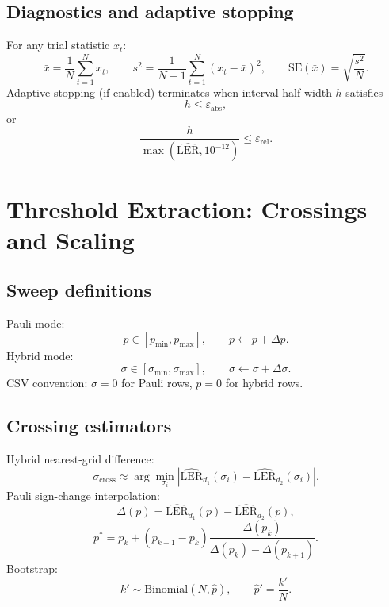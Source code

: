 \documentclass[11pt]{article}
\begin{document}
\subsection{Diagnostics and adaptive stopping}
For any trial statistic $x_t$:
\begin{equation}
\bar x=\frac{1}{N}\sum_{t=1}^N x_t,\qquad
s^2=\frac{1}{N-1}\sum_{t=1}^N(x_t-\bar x)^2,\qquad
\mathrm{SE}(\bar x)=\sqrt{\frac{s^2}{N}}.
\end{equation}
Adaptive stopping (if enabled) terminates when interval half-width $h$ satisfies
\begin{equation}
h\le\varepsilon_{\mathrm{abs}},
\end{equation}
or
\begin{equation}
\frac{h}{\max(\widehat{\mathrm{LER}},10^{-12})}\le\varepsilon_{\mathrm{rel}}.
\end{equation}

\section{Threshold Extraction: Crossings and Scaling}
\subsection{Sweep definitions}
Pauli mode:
\begin{equation}
p\in[p_{\min},p_{\max}],\qquad p\leftarrow p+\Delta p.
\end{equation}
Hybrid mode:
\begin{equation}
\sigma\in[\sigma_{\min},\sigma_{\max}],\qquad \sigma\leftarrow \sigma+\Delta \sigma.
\end{equation}
CSV convention: $\sigma=0$ for Pauli rows, $p=0$ for hybrid rows.

\subsection{Crossing estimators}
Hybrid nearest-grid difference:
\begin{equation}
\sigma_{\mathrm{cross}}\approx\arg\min_{\sigma_i}
\left|
\widehat{\mathrm{LER}}_{d_1}(\sigma_i)-\widehat{\mathrm{LER}}_{d_2}(\sigma_i)
\right|.
\end{equation}
Pauli sign-change interpolation:
\begin{equation}
\Delta(p)=\widehat{\mathrm{LER}}_{d_1}(p)-\widehat{\mathrm{LER}}_{d_2}(p),
\end{equation}
\begin{equation}
p^*=p_k+(p_{k+1}-p_k)\frac{\Delta(p_k)}{\Delta(p_k)-\Delta(p_{k+1})}.
\end{equation}
Bootstrap:
\begin{equation}
k'\sim\mathrm{Binomial}(N,\hat p),\qquad \hat p'=\frac{k'}{N}.
\end{equation}
\end{document}
